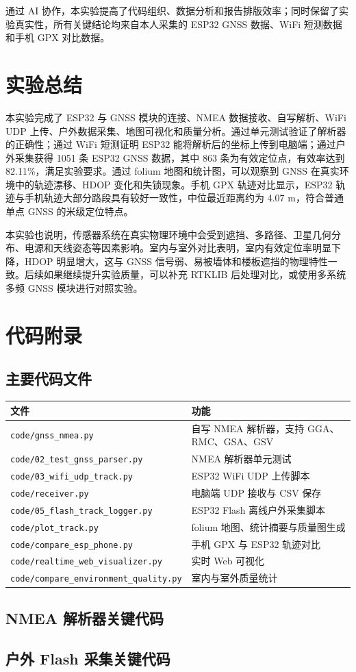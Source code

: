 \documentclass[UTF8,a4paper,12pt]{ctexart}
\begin{document}
通过 AI 协作，本实验提高了代码组织、数据分析和报告排版效率；同时保留了实验真实性，所有关键结论均来自本人采集的 ESP32 GNSS 数据、WiFi 短测数据和手机 GPX 对比数据。

\section{实验总结}
本实验完成了 ESP32 与 GNSS 模块的连接、NMEA 数据接收、自写解析、WiFi UDP 上传、户外数据采集、地图可视化和质量分析。通过单元测试验证了解析器的正确性；通过 WiFi 短测证明 ESP32 能将解析后的坐标上传到电脑端；通过户外采集获得 1051 条 ESP32 GNSS 数据，其中 863 条为有效定位点，有效率达到 82.11\%，满足实验要求。通过 folium 地图和统计图，可以观察到 GNSS 在真实环境中的轨迹漂移、HDOP 变化和失锁现象。手机 GPX 轨迹对比显示，ESP32 轨迹与手机轨迹大部分路段具有较好一致性，中位最近距离约为 4.07 m，符合普通单点 GNSS 的米级定位特点。

本实验也说明，传感器系统在真实物理环境中会受到遮挡、多路径、卫星几何分布、电源和天线姿态等因素影响。室内与室外对比表明，室内有效定位率明显下降，HDOP 明显增大，这与 GNSS 信号弱、易被墙体和楼板遮挡的物理特性一致。后续如果继续提升实验质量，可以补充 RTKLIB 后处理对比，或使用多系统多频 GNSS 模块进行对照实验。

\clearpage
\appendix
\section{代码附录}
\subsection{主要代码文件}
\begin{longtable}{p{}p{}}
\toprule
文件 & 功能 \\
\midrule
\verb|code/gnss_nmea.py| & 自写 NMEA 解析器，支持 GGA、RMC、GSA、GSV \\
\verb|code/02_test_gnss_parser.py| & NMEA 解析器单元测试 \\
\verb|code/03_wifi_udp_track.py| & ESP32 WiFi UDP 上传脚本 \\
\verb|code/receiver.py| & 电脑端 UDP 接收与 CSV 保存 \\
\verb|code/05_flash_track_logger.py| & ESP32 Flash 离线户外采集脚本 \\
\verb|code/plot_track.py| & folium 地图、统计摘要与质量图生成 \\
\verb|code/compare_esp_phone.py| & 手机 GPX 与 ESP32 轨迹对比 \\
\verb|code/realtime_web_visualizer.py| & 实时 Web 可视化 \\
\verb|code/compare_environment_quality.py| & 室内与室外质量统计 \\
\bottomrule
\end{longtable}

\subsection{NMEA 解析器关键代码}


\subsection{户外 Flash 采集关键代码}

\end{document}
